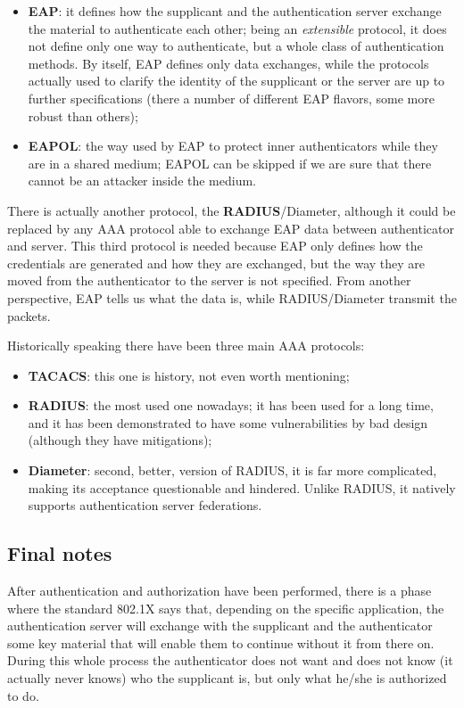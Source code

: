 \begin{itemize}
	\item \textbf{EAP}: it defines how the supplicant and the authentication server exchange the material to authenticate each other; being an \textit{extensible} protocol, it does not define only one way to authenticate, but a whole class of authentication methods. By itself, EAP defines only data exchanges, while the protocols actually used to clarify the identity of the supplicant or the server are up to further specifications (there a number of different EAP flavors, some more robust than others);
	\item \textbf{EAPOL}: the way used by EAP to protect inner authenticators while they are in a shared medium; EAPOL can be skipped if we are sure that there cannot be an attacker inside the medium.
\end{itemize}

There is actually another protocol, the \textbf{RADIUS}/Diameter, although it could be replaced by any AAA protocol able to exchange EAP data between authenticator and server. This third protocol is needed because EAP only defines how the credentials are generated and how they are exchanged, but the way they are moved from the authenticator to the server is not specified. From another perspective, EAP tells us what the data is, while RADIUS/Diameter transmit the packets.

Historically speaking there have been three main AAA protocols:

\begin{itemize}
	\item \textbf{TACACS}: this one is history, not even worth mentioning;
	\item \textbf{RADIUS}: the most used one nowadays; it has been used for a long time, and it has been demonstrated to have some vulnerabilities by bad design (although they have mitigations);
	\item \textbf{Diameter}: second, better, version of RADIUS, it is far more complicated, making its acceptance questionable and hindered. Unlike RADIUS, it natively supports authentication server federations.
\end{itemize}
 

\subsection*{Final notes}
After authentication and authorization have been performed, there is a phase where the standard 802.1X says that, depending on the specific application, the authentication server will exchange with the supplicant and the authenticator some key material that will enable them to continue without it from there on. During this whole process the authenticator does not want and does not know (it actually never knows) who the supplicant is, but only what he/she is authorized to do.

